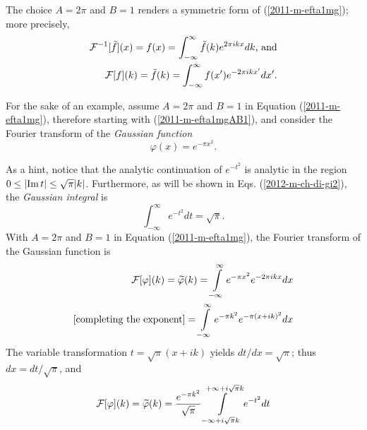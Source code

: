 The choice $A=2\pi $ and $B=1$ renders a  symmetric form of (\ref{2011-m-efta1mg}); more precisely,
\begin{equation}
\begin{split}
 {\cal F}^{-1}[\tilde{f}](x)=f(x)=   \int_{-\infty}^\infty \tilde{f}(k) e^{  2\pi i{kx}} dk \textrm{, and} \\
 {\cal F}[f](k)=\tilde{f}(k)=    \int_{-\infty}^\infty  f(x') e^{-  2\pi  i {kx'}} dx'
.
\end{split}
\label{2011-m-efta1mgAB1}
\end{equation}

{
\color{blue}
\bexample


For the sake of an example,
assume $A=2\pi $ and $B=1$  in Equation (\ref{2011-m-efta1mg}), therefore starting with (\ref{2011-m-efta1mgAB1}),
and consider the  Fourier transform of the  {\em Gaussian function}
\begin{equation}
\varphi (x)= e^{-\pi x^2}   .
\label{2012-m-ch-fa-gaussian}
\end{equation}


As a hint, notice that
the analytic continuation of $e^{-t^2}$ is analytic in the region $0\le \vert {\rm Im}\,t\vert \le \sqrt{\pi }\vert k \vert$.
Furthermore, as will be shown in Eqs. (\ref{2012-m-ch-di-gi2}), the {\em Gaussian integral}
 is
\begin{equation}
\int_{-\infty}^\infty
 e^{-t^2} dt =\sqrt{\pi }  .
\end{equation}
With $A=2\pi $ and $B=1$  in Equation (\ref{2011-m-efta1mg}), the Fourier transform of the  Gaussian function is
\begin{equation}
\begin{split}
    {\cal F}[\varphi  ](k)=\widetilde{ \varphi} (k) =  \int\limits_{-\infty}^\infty
                 e^{-\pi  x^2}  e^{- 2\pi ikx} dx
\\
\textrm{[completing the exponent]}
              =
\int\limits_{-\infty}^\infty
                 e^{-{\pi  k^2}}e^{-\pi \left(x+{i}k\right)^2}   dx
\end{split}
\end{equation}
The variable transformation  $t=\sqrt{\pi} (x + {i}k) $
yields
$dt/ dx=\sqrt{\pi} $; thus $dx = dt/ \sqrt{\pi}$, and
\begin{equation}
   {\cal F}[\varphi  ](k)=\widetilde{ \varphi} (k)=\frac{ e^{-{\pi k^2}}}{\sqrt{\pi} }
                 \int\limits_{-\infty+i\sqrt{\pi} {k}}^{+\infty+i\sqrt{\pi} {k}}
                 e^{-t^2}  dt
\label{2012-m-ch-dergauin1}
\end{equation}

}

